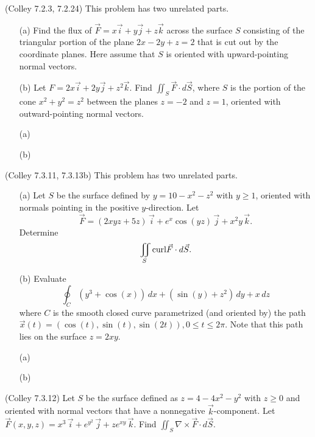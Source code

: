 \documentclass[11pt,letterpaper,cm]{nupset}
\begin{document}
\begin{problem}[Exercise 3] (Colley 7.2.3, 7.2.24) This problem has two unrelated parts.
	\begin{itemize}
		\item[(a)] Find the flux of $\vec{F} = x\vec{i}+y\vec{j}+z\vec{k}$ across the surface $S$ consisting of the triangular portion of the plane $2x-2y+z=2$ that is cut out by the coordinate planes. Here assume that $S$ is oriented with upward-pointing normal vectors.
		\item[(b)] Let $F=2x\vec{i}+2y\vec{j}+z^2\vec{k}$. Find $\displaystyle \iint_S \vec{F}\cdot d\vec{S}$, where $S$ is the portion of the cone $x^2+y^2=z^2$ between the planes $z=-2$ and $z=1$, oriented with outward-pointing normal vectors.
	\end{itemize}
\end{problem}
\begin{solution}
	\begin{itemize}
	\item[(a)] 
	\item[(b)] 
\end{itemize}
\end{solution}
\newpage

\begin{problem}[Exercise 4] (Colley 7.3.11, 7.3.13b) This problem has two unrelated parts. 
	\begin{itemize}
		\item[(a)] Let $S$ be the surface defined by $y=10-x^2-z^2$ with $y \ge 1$, oriented with normals pointing in the positive $y$-direction. Let $$\vec{F} = (2xyz+5z)\,\vec{i}+e^x\cos(yz)\,\vec{j}+x^2y\,\vec{k}.$$
		Determine $$\iint_S {\rm curl}\vec{F} \cdot d\vec{S}.$$
		\item[(b)] Evaluate $$\oint_C (y^3+\cos(x))\,dx+(\sin(y)+z^2)\,dy + x\,dz$$
		where $C$ is the smooth closed curve parametrized (and oriented by) the path $\vec{x}(t) = (\cos(t),\sin(t),\sin(2t)), 0 \le t \le 2\pi$. Note that this path lies on the surface $z=2xy$.
	\end{itemize}
\end{problem}
\begin{solution}
	\begin{itemize}
		\item[(a)] 
		\item[(b)] 
	\end{itemize}
\end{solution}
\newpage

\begin{problem}[Exercise 5] (Colley 7.3.12) Let $S$ be the surface defined as $z=4-4x^2-y^2$ with $z \ge 0$ and oriented with normal vectors that have a nonnegative $\vec{k}$-component. Let $\vec{F}(x,y,z) = x^3\,\vec{i}+e^{y^2}\,\vec{j}+ze^{xy}\,\vec{k}$. Find $\displaystyle\iint_S \nabla \times \vec{F} \cdot d\vec{S}$.
\end{problem}
\begin{solution}
\end{solution}
\newpage
\end{document}

